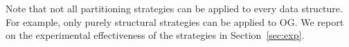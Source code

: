 
Note that not all partitioning strategies can be applied to every data
structure.  For example, only purely structural strategies can be
applied to OG.  We report on the experimental effectiveness of the
strategies in Section~\ref{sec:exp}.


